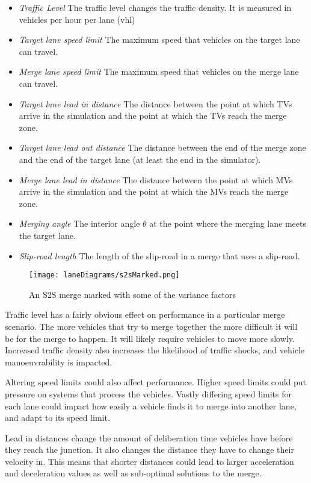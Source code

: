 \begin{itemize}
\item \textit{Traffic Level} 
The traffic level changes the traffic density. It is measured in vehicles per hour per lane (\si{vhl})
\item \textit{Target lane speed limit}
The maximum speed that vehicles on the target lane can travel.
\item \textit{Merge lane speed limit}
The maximum speed that vehicles on the merge lane can travel.
\item \textit{Target lane lead in distance}
The distance between the point at which TVs arrive in the simulation and the point at which the TVs reach the merge zone.
\item \textit{Target lane lead out distance}
The distance between the end of the merge zone and the end of the target lane (at least the end in the simulator).
\item \textit{Merge lane lead in distance}
The distance between the point at which MVs arrive in the simulation and the point at which the MVs reach the merge zone.
\item \textit{Merging angle}
The interior angle $\theta$ at the point where the merging lane meets the target lane.
\item \textit{Slip-road length}
The length of the slip-road in a merge that uses a slip-road.
\end{itemize}

\begin{figure}[htb]
\texttt{[image: laneDiagrams/s2sMarked.png]}
\caption{An S2S merge marked with some of the variance factors}
\label{fig:s2sMarked}
\end{figure}

Traffic level has a fairly obvious effect on performance in a particular merge scenario. The more vehicles that try to merge together the more difficult it will be for the merge to happen. It will likely require vehicles to move more slowly. Increased traffic density also increases the likelihood of traffic shocks, and vehicle manoeuvrability is impacted.

Altering speed limits could also affect performance. Higher speed limits could put pressure on systems that process the vehicles. Vastly differing speed limits for each lane could impact how easily a vehicle finds it to merge into another lane, and adapt to its speed limit.

Lead in distances change the amount of deliberation time vehicles have before they reach the junction. It also changes the distance they have to change their velocity in. This means that shorter distances could lead to larger acceleration and deceleration values as well as sub-optimal solutions to the merge. 

